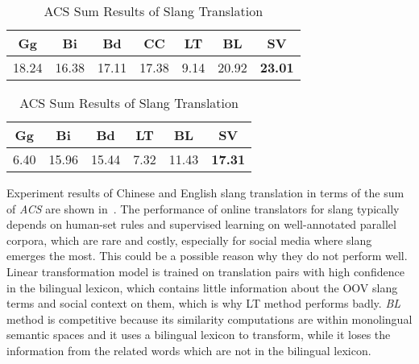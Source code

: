 \begin{table}[H] 
	\small
	\centering
	\begin{subtable}[h]{\columnwidth}
		\centering
		\begin{tabular}{|c|c|c|c|c|c|c|}
			\hline
			Gg&  Bi& Bd & CC & LT  & BL  & SV \\ \hline
			18.24 &  16.38&  17.11 & 17.38 & 9.14&  20.92& \textbf{23.01}\\ \hline  
		\end{tabular}
	\end{subtable}
	\vfill \hfill
	\begin{subtable}[h]{\columnwidth}
		\centering
		\begin{tabular}{|c|c|c|c|c|c|}
			\hline
			Gg&  Bi& Bd &  LT  & BL  & SV \\ \hline
			6.40 &  15.96 &  15.44 &  7.32 &  11.43& \textbf{17.31} \\ \hline  
		\end{tabular}
	\end{subtable}
	\caption{ACS Sum Results of Slang Translation}
	\label{tab:bleis_acs}
\end{table}
Experiment results of Chinese and English slang translation in terms of the sum of \textit{ACS} are shown in~.
The performance of online translators for slang typically depends on human-set rules and supervised learning on well-annotated parallel corpora, which are rare and costly, especially for social media where slang emerges the most. This could be a possible reason why they do not perform well. 
Linear transformation model is trained on translation pairs with high confidence in the bilingual lexicon, which contains little information about the OOV slang terms and social context on them, which is why LT method performs badly.
\textit{BL} method is competitive because its similarity computations 
are within monolingual semantic spaces and it uses a bilingual lexicon 
to transform, while it loses the information from the related words 
which are not in the bilingual lexicon.
